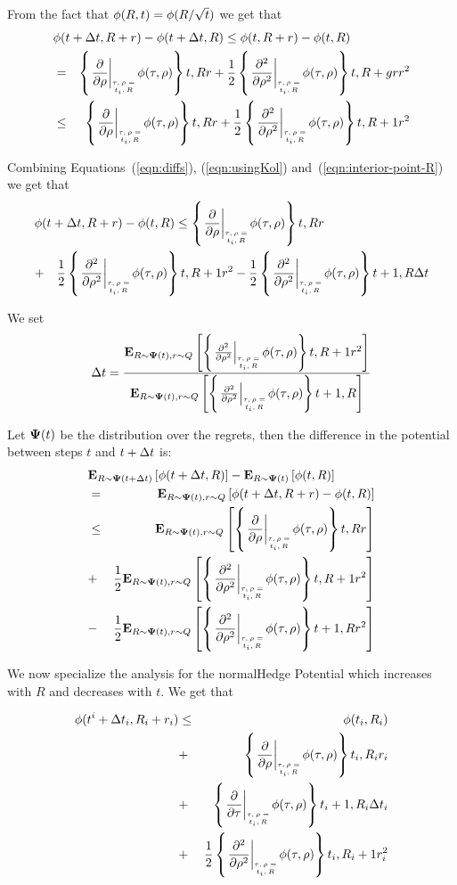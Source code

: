 \documentclass{article}[12pt]
\begin{document}
From the fact that $\phi(R,t) = \phi(R/\sqrt{t})$ we get that 
\begin{eqnarray}
  \lefteqn{\pot(t+\deltat,\R+r)-\pot(t+\deltat,\R)
  \leq \pot(t,\R+r)-\pot(t,\R)}&&\\
  &=&\at{\frac{\partial}{\partial \rho}}{t,R} r
  +\frac{1}{2} \at{\frac{\partial^2}{\partial \rho^2}}{t,R+g r} r^2
  \nonumber \\
  &\leq& \at{\frac{\partial}{\partial \rho}}{t,R} r
  +\frac{1}{2} \at{\frac{\partial^2}{\partial \rho^2}}{t,R+1} r^2
  \label{eqn:interior-point-R}
\end{eqnarray}

Combining Equations~(\ref{eqn:diffs}), (\ref{eqn:usingKol}) and~(\ref{eqn:interior-point-R}) we get that
\begin{eqnarray} 
  \lefteqn{\pot(t+\deltat,\R+r) - \pot(t,\R)
   \leq  \at{\frac{\partial}{\partial \rho}}{t,R} r} &&\\
   &+&   \frac{1}{2} \at{\frac{\partial^2}{\partial \rho^2}}{t,R+1} r^2
   - \frac{1}{2} \at{\frac{\partial^2}{\partial \rho^2}}{t+1,R} \deltat
\end{eqnarray}

 We set
 \[
   \deltat  = \frac{\E{R \sim \state(t), r \sim Q}{\at{\frac{\partial^2}{\partial \rho^2}}{t,R+1}r^2}}
   {\E{R \sim \state(t), r \sim Q}{\at{\frac{\partial^2}{\partial \rho^2}}{t+1,R}}}
 \]

Let ${\bf \Psi}(t)$ be the distribution over the regrets, then the difference in the potential between steps $t$ and $t+\Delta t$ is:
\begin{eqnarray}
  \lefteqn{\E{\R \sim \state(t+\deltat)}{\pot(t+\deltat,\R)} -
  \E{\R \sim \state(t)}{\pot(t,\R)} }
  &&\\
  &=&
      \E{R \sim \state(t), r \sim Q}{\pot(t+\deltat,R+r) - \pot(t,\R)} \\
  &\leq&
         \E{R \sim \state(t), r \sim Q}
         {\at{\frac{\partial}{\partial \rho}}{t,R} r}\\
  &+&
      \frac{1}{2}\E{R \sim \state(t), r \sim Q}
      {\at{\frac{\partial^2}{\partial \rho^2}}{t,R+1} r^2}\\
  &-&
      \frac{1}{2} \E{R \sim \state(t), r \sim Q}{\at{\frac{\partial^2}{\partial \rho^2}}{t+1,R}r^2}
\end{eqnarray}


\iffalse
We now specialize the analysis for the normalHedge Potential which increases with $R$ and decreases with $t$. We get that 

\begin{eqnarray} 
  \pot(t^i+\deltat_i,\R_i+r_i) &\leq& \pot(t_i,\R_i) \\
  &+&\at{\frac{\partial}{\partial \rho}}{t_i,R_i} r_i \\
  &+&\at{\frac{\partial}{\partial \tau}}{t_i+1,R_i}  \deltat_i \\
  &+& \frac{1}{2} \at{\frac{\partial^2}{\partial \rho^2}}{t_i,R_i+1} r_i^2 \\
\end{eqnarray}
\end{document}
